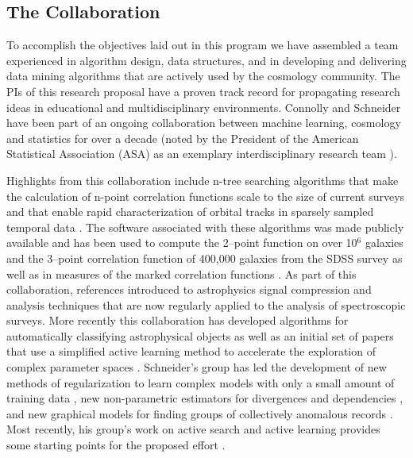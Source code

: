 \documentclass[prd,nofootbib,floatfix,11pt,tightenlines,nofootinbib]{revtex4}
\begin{document}
\subsection{The Collaboration}

To accomplish the objectives laid out in this program we have
assembled a team experienced in algorithm design, data structures, and
in developing and delivering data mining algorithms that are actively
used by the cosmology community. The PIs of this research proposal
have a proven track record for propagating research ideas in
educational and multidisciplinary environments. Connolly and Schneider
have been part of an ongoing collaboration between machine learning,
cosmology and statistics for over a decade (noted by the President
of the American Statistical Association (ASA) as an exemplary
interdisciplinary research team \cite{straf03}).

Highlights from this collaboration include n-tree searching algorithms that
make the calculation of n-point correlation functions scale to the size of
current surveys \cite{GrayMoore} and that enable rapid characterization of
orbital tracks in sparsely sampled temporal data \cite{kubica}. The
software associated with these algorithms was made publicly available and
has been used to compute the 2--point function on over 10$^6$ galaxies and
the 3--point correlation function of 400,000 galaxies from the SDSS survey
\cite{Scranton2002,Szapudi2002,Nichol2006,mcbride2011a,mcbride2011b} as
well as in measures of the marked correlation functions \cite{Skibba2006}.
As part of this collaboration,
references \cite{yip2004a, vdp2009, daniel2011}
introduced to astrophysics signal compression and analysis techniques that
are now regularly applied to the analysis of spectroscopic surveys. More
recently this collaboration has developed algorithms for automatically
classifying astrophysical objects \cite{vdp2009,daniel2011} as well as an
initial set of papers that use a simplified active learning method to
accelerate the exploration of complex parameter spaces \cite{daniel2012}.
Schneider's group has led the development of new methods of regularization
to learn complex models with only a small amount of training data
\cite{YiZhangICML2010,YiZhangSDM2010,YiZhangMultitask2010,YiZhang2011multiECOC,YiZhang2012},
new non-parametric estimators for divergences and dependencies
\cite{poczos11alphadiv,Poczos2011UAI,poczos12CVPR}, and new graphical
models for finding groups of collectively anomalous records
\cite{Xiong2011gad,xiong2011fgm}.  Most recently, his group's work on
active search and active learning provides some starting points for the
proposed effort \cite{Tesch13,Wang13,Sutherland13,Garnett12}.
 
\end{document}
